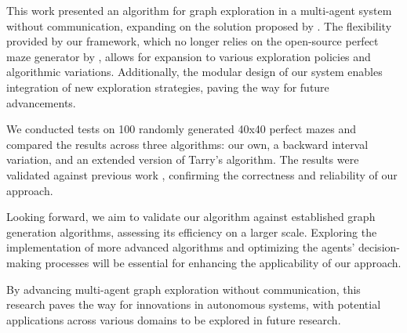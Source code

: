 This work presented an algorithm for graph exploration in a multi-agent system without communication, 
expanding on the solution proposed by .
The flexibility provided by our framework,
which no longer relies on the open-source perfect maze generator by ,
allows for expansion to various exploration policies and algorithmic variations.
Additionally, the modular design of our system enables integration of new exploration
strategies, paving the way for future advancements.

We conducted tests on 100 randomly generated 40x40 perfect mazes
and compared the results across three algorithms: 
our own, a backward interval variation, 
and an extended version of Tarry's algorithm. 
The results were validated against previous work \cite{Arthur2023},
confirming the correctness and reliability of our approach.

Looking forward, we aim to validate our algorithm
against established graph generation algorithms,
assessing its efficiency on a larger scale.
Exploring the implementation of more advanced algorithms
and optimizing the agents' decision-making processes will be essential
for enhancing the applicability of our approach.

By advancing multi-agent graph exploration without communication,
this research paves the way for innovations in autonomous systems,
with potential applications across various domains to be explored in future research.
